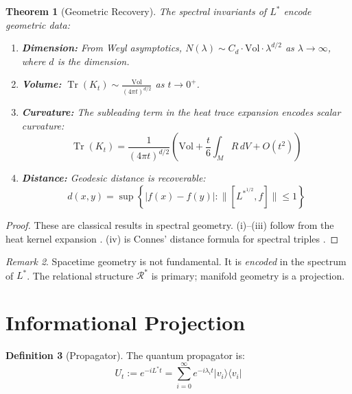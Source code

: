 \documentclass[11pt,a4paper]{article}
\theoremstyle{plain}
\newtheorem{theorem}{Theorem}[section]
\theoremstyle{definition}
\newtheorem{definition}[theorem]{Definition}
\theoremstyle{remark}
\newtheorem{remark}[theorem]{Remark}
\newcommand{\Laplacian}{L^*}
\newcommand{\norm}[1]{\| #1 \|}
\newcommand{\Tr}{\operatorname{Tr}}
\begin{document}
\begin{theorem}[Geometric Recovery]\label{thm:geometric}
The spectral invariants of $\Laplacian$ encode geometric data:
\begin{enumerate}[label=(\roman*),noitemsep]
    \item \textbf{Dimension:} From Weyl asymptotics, $N(\lambda) \sim C_d \cdot \text{Vol} \cdot \lambda^{d/2}$ as $\lambda \to \infty$, where $d$ is the dimension.
    \item \textbf{Volume:} $\Tr(K_t) \sim \frac{\text{Vol}}{(4\pi t)^{d/2}}$ as $t \to 0^+$.
    \item \textbf{Curvature:} The subleading term in the heat trace expansion encodes scalar curvature:
    \[
    \Tr(K_t) = \frac{1}{(4\pi t)^{d/2}} \left( \text{Vol} + \frac{t}{6} \int_M R \, dV + O(t^2) \right)
    \]
    \item \textbf{Distance:} Geodesic distance is recoverable:
    \[
    d(x,y) = \sup\left\{ |f(x) - f(y)| : \norm{[\Laplacian^{1/2}, f]} \leq 1 \right\}
    \]
\end{enumerate}
\end{theorem}

\begin{proof}
These are classical results in spectral geometry. (i)--(iii) follow from the heat kernel expansion \cite{gilkey1995}. (iv) is Connes' distance formula for spectral triples \cite{connes1994}.
\end{proof}

\begin{remark}
Spacetime geometry is not fundamental. It is \emph{encoded} in the spectrum of $\Laplacian$. The relational structure $\mathcal{R}^*$ is primary; manifold geometry is a projection.
\end{remark}

\section{Informational Projection}

\begin{definition}[Propagator]\label{def:propagator}
The quantum propagator is:
\begin{equation}
U_t := e^{-i\Laplacian t} = \sum_{i=0}^{\infty} e^{-i\lambda_i t} |v_i\rangle\langle v_i|
\end{equation}
\end{definition}
\end{document}
